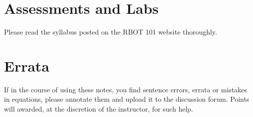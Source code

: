 \section{Assessments and Labs}

Please read the syllabus posted on the RBOT 101 website thoroughly.

\section{Errata}

If in the course of using these notes, you find sentence errors, errata or mistakes in equations, please annotate them and upload it to the discussion forum. Points will awarded, at the discretion of the instructor, for such help.